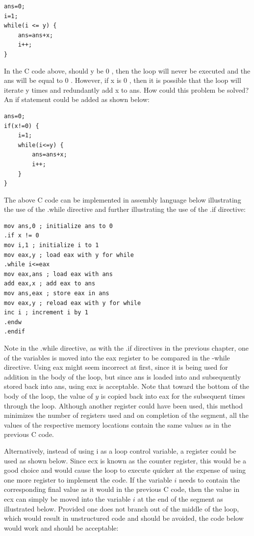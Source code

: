\documentclass[10pt]{article}
\begin{document}
\begin{verbatim}
ans=0;
i=1;
while(i <= y) {
    ans=ans+x;
    i++;
}
\end{verbatim}

In the C code above, should y be 0 , then the loop will never be executed and the ans will be equal to 0 . However, if x is 0 , then it is possible that the loop will iterate y times and redundantly add x to ans. How could this problem be solved? An if statement could be added as shown below:

\begin{verbatim}
ans=0;
if(x!=0) {
    i=1;
    while(i<=y) {
        ans=ans+x;
        i++;
    }
}
\end{verbatim}

The above C code can be implemented in assembly language below illustrating the use of the .while directive and further illustrating the use of the .if directive:

\begin{verbatim}
mov ans,0 ; initialize ans to 0
.if x != 0
mov i,1 ; initialize i to 1
mov eax,y ; load eax with y for while
.while i<=eax
mov eax,ans ; load eax with ans
add eax,x ; add eax to ans
mov ans,eax ; store eax in ans
mov eax,y ; reload eax with y for while
inc i ; increment i by 1
.endw
.endif
\end{verbatim}

Note in the .while directive, as with the .if directives in the previous chapter, one of the variables is moved into the eax register to be compared in the -while directive. Using eax might seem incorrect at first, since it is being used for addition in the body of the loop, but since ans is loaded into and subsequently stored back into ans, using eax is acceptable. Note that toward the bottom of the body of the loop, the value of $y$ is copied back into eax for the subsequent times through the loop. Although another register could have been used, this method minimizes the number of registers used and on completion of the segment, all the\\
values of the respective memory locations contain the same values as in the previous C code.

Alternatively, instead of using i as a loop control variable, a register could be used as shown below. Since ecx is known as the counter register, this would be a good choice and would cause the loop to execute quicker at the expense of using one more register to implement the code. If the variable $i$ needs to contain the corresponding final value as it would in the previous C code, then the value in ecx can simply be moved into the variable $i$ at the end of the segment as illustrated below. Provided one does not branch out of the middle of the loop, which would result in unstructured code and should be avoided, the code below would work and should be acceptable:
\end{document}
